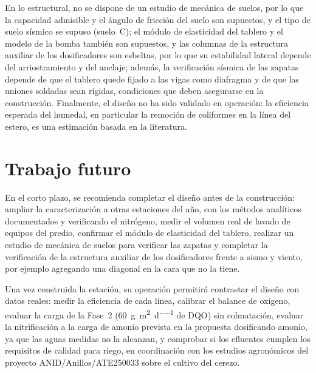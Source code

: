 En lo estructural, no se dispone de un estudio de mecánica de suelos, por lo que la capacidad admisible y el ángulo de fricción del suelo son supuestos, y el tipo de suelo sísmico se supuso (suelo~C); el módulo de elasticidad del tablero y el modelo de la bomba también son supuestos, y las columnas de la estructura auxiliar de los dosificadores son esbeltas, por lo que su estabilidad lateral depende del arriostramiento y del anclaje; además, la verificación sísmica de las zapatas depende de que el tablero quede fijado a las vigas como diafragma y de que las uniones soldadas sean rígidas, condiciones que deben asegurarse en la construcción.
Finalmente, el diseño no ha sido validado en operación: la eficiencia esperada del humedal, en particular la remoción de coliformes en la línea del estero, es una estimación basada en la literatura.

\section{Trabajo futuro}
\label{sec:trabajo-futuro}

En el corto plazo, se recomienda completar el diseño antes de la construcción: ampliar la caracterización a otras estaciones del año, con los métodos analíticos documentados y verificando el nitrógeno, medir el volumen real de lavado de equipos del predio, confirmar el módulo de elasticidad del tablero, realizar un estudio de mecánica de suelos para verificar las zapatas y completar la verificación de la estructura auxiliar de los dosificadores frente a sismo y viento, por ejemplo agregando una diagonal en la cara que no la tiene.

Una vez construida la estación, su operación permitirá contrastar el diseño con datos reales: medir la eficiencia de cada línea, calibrar el balance de oxígeno, evaluar la carga de la Fase~2 (\qty{60}{\gram\per\square\meter\per\day} de DQO) sin colmatación, evaluar la nitrificación a la carga de amonio prevista en la propuesta dosificando amonio, ya que las aguas medidas no la alcanzan, y comprobar si los efluentes cumplen los requisitos de calidad para riego, en coordinación con los estudios agronómicos del proyecto ANID/Anillos/ATE250033 sobre el cultivo del cerezo.
